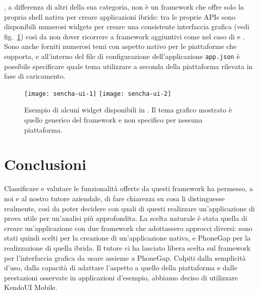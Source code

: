             \senchat{}, a differenza di altri della sua categoria, non è un
            frame\-work che offre solo la propria shell nativa per creare
            applicazioni ibride: tra le proprie APIs sono disponibili numerosi
            widgets per creare una consistente interfaccia grafica
            (vedi fig.~\ref{fig:senchaui}) così da non dover ricorrere a
            frame\-work aggiuntivi come nel caso di \pg{} e \rhom{}. Sono anche
            forniti numerosi temi con aspetto nativo per le piattaforme che
            supporta, e all'interno del file di configurazione dell'applicazione
            \verb|app.json| è possibile specificare quale tema utilizzare a
            seconda della piattaforma rilevata in fase di caricamento.
            \begin{figure}[h]
                \centering
                \texttt{[image: sencha-ui-1]}
                \texttt{[image: sencha-ui-2]}
                \caption{
                    Esempio di alcuni widget disponibili in \senchat{}.
                    Il tema grafico mostrato è quello generico del frame\-work e
                    non specifico per nessuna piattaforma.
                }
                \label{fig:senchaui}
            \end{figure}

    \section{Conclusioni}
        Classificare e valutare le funzionalità offerte da questi frame\-work
        ha permesso, a noi e al nostro tutore aziendale, di fare chiarezza su cosa
        li distinguesse realmente, così
        da poter decidere con quali di questi realizzare un'applicazione di prova utile
        per un'analisi più approfondita.
        La scelta naturale è stata quella di creare un'applicazione con due
        frame\-work che adottassero approcci diversi: sono stati quindi scelti
        \tisdk{} per la creazione di un'applicazione nativa, e
        PhoneGap per la realizzazione di quella ibrida.
        Il tutore ci ha lasciato libera scelta sul frame\-work per l'interfaccia
        grafica da usare assieme a PhoneGap. Colpiti dalla semplicità d'uso,
        dalla capacità di adattare l'aspetto a quello della piattaforma e
        dalle prestazioni osservate in applicazioni d'esempio, abbiamo deciso
        di utilizzare KendoUI Mobile.

